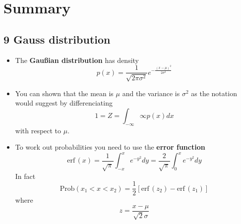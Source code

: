 \ifind
\section*{Summary}
\else
\subsection*{9 Gauss distribution}
\fi

\begin{itemize}

\item The \textbf{Gau\ss{}ian distribution} has density
  \begin{equation}
p(x)=\frac{1}{\sqrt{2\pi\sigma^2}}e^{-\frac{(x-\mu)^2}{2\sigma^2}}
  \end{equation}


\item You can  shown that the mean is $\mu$ and the variance is $\sigma^2$ as the notation would suggest by differenciating
\begin{equation}
1=Z=\int_{-\infty}\infty p(x)dx
\end{equation}
with respect to $\mu$.


\item To work out probabilities you need to use the \textbf{error function}
  \begin{equation}
\mbox{erf}\,(x)=\frac{1}{\sqrt{\pi}}\int_{-x}^xe^{-y^2}dy=\frac{2}{\sqrt{\pi}}\int_0^xe^{-y^2}dy
  \end{equation}
  In fact
  \begin{equation}
\mbox{Prob}(x_1<x<x_2)=\frac{1}{2}[\mbox{erf}\,(z_2)-\mbox{erf}\,(z_1)]
  \end{equation}
  where
  \begin{equation}
z=\frac{x-\mu}{\sqrt{2}\sigma}
  \end{equation}
  \end{itemize}
